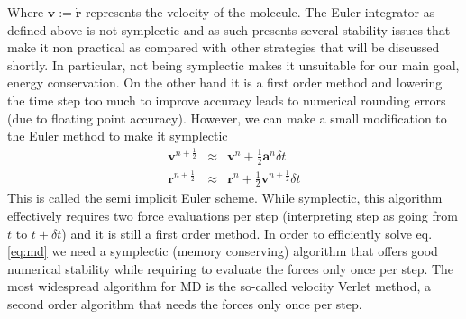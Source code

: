 \documentclass[ twoside,openright,titlepage,numbers=noenddot,%
headinclude,footinclude,cleardoublepage=empty,abstract=on,
BCOR=5mm,paper=a4,fontsize=11pt, dvipsnames
]{scrreprt}
\renewcommand{\vec}[1]{\bm{#1}}
\newcommand{\dt}{\delta t}
\newcommand{\half}{\frac{1}{2}}
\begin{document}
Where $\vec{v} := \dot{\vec{r}}$ represents the velocity of the molecule.
The Euler integrator as defined above is not symplectic\cite{symplectic} and as such presents several stability issues that make it non practical as compared with other strategies that will be discussed shortly. In particular, not being symplectic makes it unsuitable for our main goal, energy conservation\cite{eulerdrift}. On the other hand it is a first order method and lowering the time step too much to improve accuracy leads to numerical rounding errors (due to floating point accuracy).
However, we can make a small modification to the Euler method to make it symplectic\cite{HairerNumericalIntegration}
\begin{equation}
  \label{eq:semiimpliciteuler}
  \begin{aligned}
    \vec{v}^{n+\half} &\approx& \vec{v}^n + \half\vec{a}^n\dt\\
    \vec{r}^{n+\half} &\approx& \vec{r}^n + \half\vec{v}^{n+\half}\dt
  \end{aligned}
\end{equation}
This is called the semi implicit Euler scheme\cite{semiimplicitEuler}. While symplectic, this algorithm effectively requires two force evaluations per step (interpreting step as going from $t$ to $t+\dt$) and it is still a first order method.
In order to efficiently solve eq. \eqref{eq:md} we need a symplectic (memory conserving) algorithm that offers good numerical stability while requiring to evaluate the forces only once per step.
The most widespread algorithm for \gls{MD} is the so-called velocity Verlet method\cite{mdvelocityverlet}, a second order algorithm that needs the forces only once per step.
\end{document}
